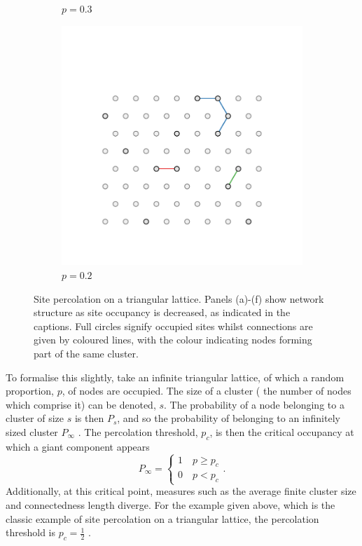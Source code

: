 \begin{figure}[bt]
\begin{subfigure}[b]{0.3\textwidth}
         \caption{$p=0.3$}
         \label{fig:perctri3}
     \end{subfigure}
     \hfill
         \begin{subfigure}[b]{0.3\textwidth}
         \centering
         \includegraphics[width=\textwidth]{./figures/targeted_opt/perc_tri_2.pdf}
         \caption{$p=0.2$}
         \label{fig:perctri2}
     \end{subfigure}
     \hfill
     
     \caption{Site percolation on a triangular lattice. Panels (a)\--(f) show network structure as site occupancy is decreased, as indicated in the captions. Full circles signify occupied sites whilst connections are given by coloured lines, with the colour indicating nodes forming part of the same cluster.}
     \label{fig:perctri}
\end{figure}

To formalise this slightly, take an infinite triangular lattice, of which a random proportion, $p$, of nodes are occupied.
The size of a cluster (\ie{} the number of nodes which comprise it) can be denoted, $s$. 
The probability of a node belonging to a cluster of size $s$ is then $P_s$, and so the probability of belonging to an infinitely sized cluster $P_{\infty}$ \cite{StaufferDietrich2014}.
The percolation threshold, $p_c$, is then the critical occupancy at which a giant component appears \ie{}
\begin{equation}
	P_{\infty}=\begin{cases} 1 \quad p\geq p_c \\
							0 \quad p<p_c
	\end{cases}.
\end{equation}
Additionally, at this critical point, measures such as the average finite cluster size and connectedness length diverge.
For the example given above, which is the classic example of site percolation on a triangular lattice, the percolation threshold is $p_c=\frac{1}{2}$  \cite{Sykes1964}.

